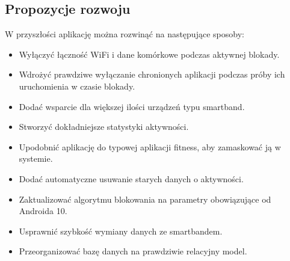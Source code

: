 \subsection{Propozycje rozwoju}
W przyszłości aplikację można rozwinąć na następujące sposoby:
\begin{itemize}
    \item Wyłączyć łączność WiFi i dane komórkowe podczas aktywnej blokady. 
    \item Wdrożyć prawdziwe wyłączanie chronionych aplikacji podczas próby ich uruchomienia w czasie blokady.
    \item Dodać wsparcie dla większej ilości urządzeń typu smartband.
    \item Stworzyć dokładniejsze statystyki aktywności.
    \item Upodobnić aplikację do typowej aplikacji fitness, aby zamaskować ją w systemie.
    \item Dodać automatyczne usuwanie starych danych o aktywności.
    \item Zaktualizować algorytmu blokowania na parametry obowiązujące od Androida 10.
    \item Usprawnić szybkość wymiany danych ze smartbandem.
    \item Przeorganizować bazę danych na prawdziwie relacyjny model.
\end{itemize}






